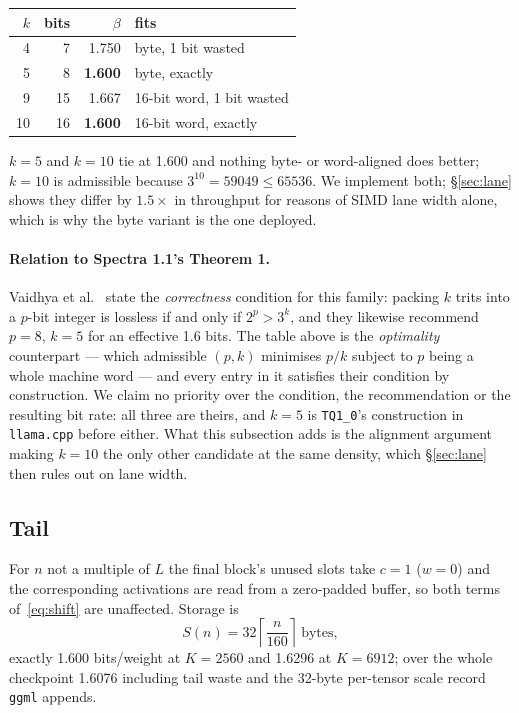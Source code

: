 \documentclass[11pt,a4paper]{article}
\newcommand{\code}[1]{\texttt{#1}}
\begin{document}
\begin{center}
\begin{tabular}{rrrl}
\toprule
$k$ & bits & $\beta$ & fits \\
\midrule
4  & 7  & 1.750 & byte, 1 bit wasted \\
5  & 8  & \textbf{1.600} & byte, exactly \\
9  & 15 & 1.667 & 16-bit word, 1 bit wasted \\
10 & 16 & \textbf{1.600} & 16-bit word, exactly \\
\bottomrule
\end{tabular}
\end{center}

$k=5$ and $k=10$ tie at \num{1.600} and nothing byte- or word-aligned does
better; $k=10$ is admissible because $3^{10} = \num{59049} \le \num{65536}$. We
implement both; \S\ref{sec:lane} shows they differ by $1.5\times$ in throughput
for reasons of SIMD lane width alone, which is why the byte variant is the one
deployed.

\paragraph{Relation to Spectra 1.1's Theorem 1.} Vaidhya et al.~\cite{spectra}
state the \emph{correctness} condition for this family: packing $k$ trits into a
$p$-bit integer is lossless if and only if $2^{p} > 3^{k}$, and they likewise
recommend $p=8$, $k=5$ for an effective \num{1.6} bits. The table above is the
\emph{optimality} counterpart --- which admissible $(p,k)$ minimises $p/k$
subject to $p$ being a whole machine word --- and every entry in it satisfies
their condition by construction. We claim no priority over the condition, the
recommendation or the resulting bit rate: all three are theirs, and $k=5$ is
\code{TQ1\_0}'s construction in \code{llama.cpp} before either. What this
subsection adds is the alignment argument making $k=10$ the only other candidate
at the same density, which \S\ref{sec:lane} then rules out on lane width.

\subsection{Tail}
For $n$ not a multiple of $L$ the final block's unused slots take $c=1$
($w=0$) and the corresponding activations are read from a zero-padded buffer, so
both terms of~\eqref{eq:shift} are unaffected. Storage is
\begin{equation}
S(n)=32\left\lceil \frac{n}{160}\right\rceil\ \text{bytes},
\end{equation}
exactly \num{1.600} bits/weight at $K=\num{2560}$ and \num{1.6296} at
$K=\num{6912}$; over the whole checkpoint \num{1.6076} including tail waste and
the 32-byte per-tensor scale record \code{ggml} appends.
\end{document}
